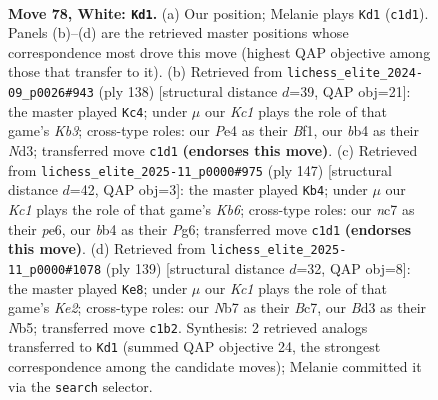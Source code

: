 \documentclass[11pt]{article}
\begin{document}
\clearpage

\begin{figure}[p]\centering
\begin{subfigure}{0.46\textwidth}\centering
\resizebox{\linewidth}{!}{%
\newchessgame
\chessboard[
  setfen={8/1Nn5/4k1n1/p7/Pb1pP3/1P1B3p/4P3/2K5 w - - 22 78},
  showmover=false,
  pgfstyle=straightmove, color=movearrow, markmove={c1-d1}
]}
\caption{}
\end{subfigure}\hfill
\begin{subfigure}{0.46\textwidth}\centering
\resizebox{\linewidth}{!}{%
\newchessgame
\chessboard[
  setfen={8/2k5/p1pbp3/P5n1/1P1P3p/1K1NP3/8/5B2 w - - 10 70},
  showmover=false,
  pgfstyle=straightmove, color=movearrow, markmove={b3-c4}
]}
\caption{}
\end{subfigure}
\\[4pt]
\begin{subfigure}{0.46\textwidth}\centering
\resizebox{\linewidth}{!}{%
\newchessgame
\chessboard[
  setfen={8/8/1p2P1p1/1Nb4p/5P1P/1k4P1/p7/K7 b - - 0 74},
  showmover=false,
  pgfstyle=straightmove, color=movearrow, markmove={b3-b4}
]}
\caption{}
\end{subfigure}\hfill
\begin{subfigure}{0.46\textwidth}\centering
\resizebox{\linewidth}{!}{%
\newchessgame
\chessboard[
  setfen={8/2b1k3/4p3/1n1bN1pp/N3p3/6PP/1B3P2/6K1 b - - 5 70},
  showmover=false,
  pgfstyle=straightmove, color=movearrow, markmove={e7-e8}
]}
\caption{}
\end{subfigure}
\caption{\textbf{Move 78, White: \texttt{Kd1}.} (a) Our position; Melanie plays \texttt{Kd1} (\texttt{c1d1}). Panels (b)--(d) are the retrieved master positions whose correspondence most drove this move (highest QAP objective among those that transfer to it). (b) Retrieved from \texttt{lichess\_elite\_2024-09\_p0026\#943} (ply 138) [structural distance $d$=39, QAP obj=21]: the master played \texttt{Kc4}; under $\mu$ our \emph{Kc1} plays the role of that game's \emph{Kb3}; cross-type roles: our \emph{P}e4 as their \emph{B}f1, our \emph{b}b4 as their \emph{N}d3; transferred move \texttt{c1d1} \textbf{(endorses this move)}. (c) Retrieved from \texttt{lichess\_elite\_2025-11\_p0000\#975} (ply 147) [structural distance $d$=42, QAP obj=3]: the master played \texttt{Kb4}; under $\mu$ our \emph{Kc1} plays the role of that game's \emph{Kb6}; cross-type roles: our \emph{n}c7 as their \emph{p}e6, our \emph{b}b4 as their \emph{P}g6; transferred move \texttt{c1d1} \textbf{(endorses this move)}. (d) Retrieved from \texttt{lichess\_elite\_2025-11\_p0000\#1078} (ply 139) [structural distance $d$=32, QAP obj=8]: the master played \texttt{Ke8}; under $\mu$ our \emph{Kc1} plays the role of that game's \emph{Ke2}; cross-type roles: our \emph{N}b7 as their \emph{B}c7, our \emph{B}d3 as their \emph{N}b5; transferred move \texttt{c1b2}. Synthesis: 2 retrieved analogs transferred to \texttt{Kd1} (summed QAP objective 24, the strongest correspondence among the candidate moves); Melanie committed it via the \texttt{search} selector.}
\label{fig:thought-m154}
\end{figure}
\end{document}
